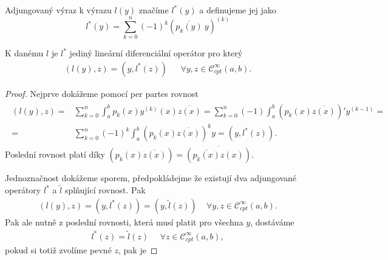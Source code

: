 \begin{definition}
Adjungovaný výraz k výrazu $l(y)$ značíme $l^*(y)$ a definujeme jej jako
\begin{equation}
    l^*(y) = \sum_{k=0}^{n} (-1)^{k} \left(\overline{p_k(y)} ~ y\right)^{(k)}
\end{equation}
\end{definition}

\begin{lemma}
K danému $l$ je $l^*$ jediný lineární diferenciální operátor pro který
\begin{align*}
    \left(l(y), z\right) = \left(y, l^*(z)\right)~ ~ ~ ~ ~ ~ ~ \forall y, z \in \mathcal{C}^{\infty}_{cpt} (a,b).
\end{align*}
\end{lemma}

\begin{proof}
Nejprve dokážeme pomocí per partes rovnost
\begin{align*}
\begin{split}
    \left(l(y), z\right) =& \sum_{k=0}^{n} \int_a^b p_k(x) y^{(k)}(x) \overline{z(x)} =
    \sum_{k=0}^{n} (-1) \int_a^b \left(p_k(x) \overline{z(x)}\right)' y^{(k-1)} = \\
    =& \sum_{k=0}^{n} (-1)^{k} \int_a^b \left(p_k(x) \overline{z(x)}\right)^{k} y =
    \left(y, l^*(z)\right).
\end{split}
\end{align*}
Poslední rovnost platí díky $\left(p_k(x) \overline{z(x)}\right) = \overline{\left(\overline{p_k(x)} z(x)\right)}$.

Jednoznačnost dokážeme sporem, předpokládejme že existují dva adjungované operátory $l^*$ a $\tilde{l}$ splňující rovnost. Pak
\begin{align*}
    \left(l(y), z\right) = \left(y, l^*(z)\right) = \left(y, \tilde{l}(z)\right) ~ ~ ~ ~ ~ \forall y, z \in \mathcal{C}^{\infty}_{cpt} (a,b).
\end{align*}
Pak ale nutně z poslední rovnosti, která musí platit pro všechna $y$,
dostáváme
\begin{align*}
    l^*(z) = \tilde{l}(z) ~ ~ ~ ~ ~ ~ \forall z \in \mathcal{C}^{\infty}_{cpt} (a,b),
\end{align*}
pokud si totiž zvolíme pevné $z$, pak je 
\end{proof}